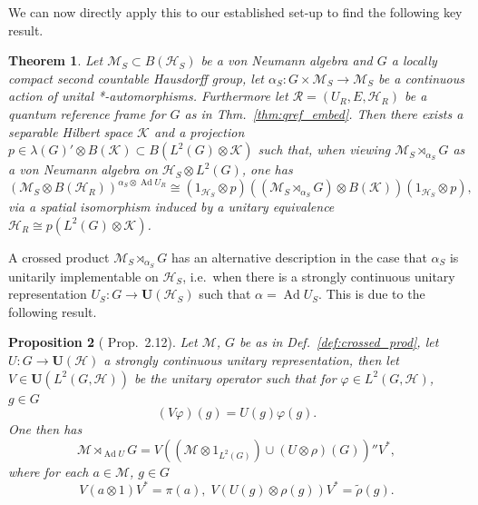 \documentclass[sn-mathphys-num]{sn-jnl}%
\newcommand{\HH}{\mathcal{H}}
\newcommand{\KK}{\mathcal{K}}
\newcommand{\MM}{\mathcal{M}}
\DeclareMathOperator{\Ad}{Ad}
\numberwithin{equation}{section}
\theoremstyle{thmstyleone}%
\newtheorem{theorem}{Theorem}[section]%
\newtheorem{proposition}[theorem]{Proposition}%
\theoremstyle{thmstyletwo}%
\theoremstyle{thmstylethree}%
\begin{document}
    We can now directly apply this to our established set-up to find the following key result.
    \begin{theorem}
    \label{thm:invariants_crossed_prod}
        Let $\MM_S\subset B(\HH_S)$ be a von Neumann algebra and $G$ a locally compact second countable Hausdorff group, let $\alpha_S:G\times\MM_S\to\MM_S$ be a continuous action of unital *-automorphisms. Furthermore let $\mathcal{R}=(U_R,E,\HH_R)$ be a quantum reference frame for $G$ as in Thm.\ \ref{thm:qref_embed}. Then there exists a separable Hilbert space $\KK$ and a projection $p\in \lambda(G)'\otimes B(\KK)\subset B(L^2(G)\otimes \KK)$ such that, when viewing $\MM_S\rtimes_{\alpha_S} G$ as a von Neumann algebra on $\HH_S\otimes L^2(G)$, one has
        \begin{equation}
            \label{eq:invariants_crossed_prod}
            (\MM_S\otimes B(\HH_R))^{\alpha_S\otimes\Ad U_R}\cong (1_{\HH_S}\otimes p)((\MM_S\rtimes_{\alpha_S}G)\otimes B(\KK))(1_{\HH_S}\otimes p),
        \end{equation}
        via a spatial isomorphism induced by a unitary equivalence $\HH_R\cong p(L^2(G)\otimes \KK)$.
    \end{theorem}
    A crossed product $\MM_S\rtimes_{\alpha_S} G$ has an alternative description in the case that $\alpha_S$ is unitarily implementable on $\HH_S$, i.e.\ when there is a strongly continuous unitary representation $U_S:G\to\mathbf{U}(\HH_S)$ such that $\alpha=\Ad U_S$. This is due to the following result.
    \begin{proposition}[\cite{vanDaele:1978} Prop.\ 2.12]
    \label{prop:crossed_prod_unitary}
        Let $\MM$, $G$ be as in Def.\ \ref{def:crossed_prod}, let $U:G\to\mathbf{U}(\HH)$ a strongly continuous unitary representation, then let $V\in \mathbf{U}(L^2(G,\HH))$ be the unitary operator such that for $\varphi\in L^2(G,\HH)$, $g\in G$
        \begin{equation}
            (V\varphi)(g)=U(g)\varphi(g).
        \end{equation}
        One then has
        \begin{equation}
            \MM\rtimes_{\Ad U}G=V((\MM\otimes 1_{L^2(G)})\cup (U\otimes \rho)(G))''V^*,
        \end{equation}
        where for each $a\in \MM$, $g\in G$
        \begin{equation}
            \label{eq:crossed_prod_alt}
            V(a\otimes 1)V^*=\pi(a),\;V(U(g)\otimes \rho(g))V^*=\tilde{\rho}(g).
        \end{equation}
    \end{proposition}
\end{document}
